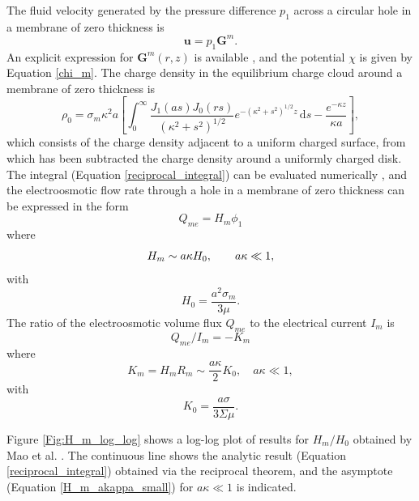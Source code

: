 The fluid velocity generated by the pressure difference $p_1$ across a circular hole in a membrane of zero thickness is
\begin{equation}
\mathbf{u}=p_1\mathbf{G}^m.
\label{u_membrane}
\end{equation}
An explicit expression for $\mathbf{G}^m(r,z)$ is available
\cite{Happel&Brenner,mao2014}, and the potential $\chi$ is given by Equation \ref{chi_m}.
The charge density in the equilibrium charge cloud around a
membrane of zero thickness is \cite{mao2014}
\begin{equation}
\rho_0 = \sigma_m\kappa^2 a \left[  \int_0^\infty
\frac{J_1(as)J_0(rs)}{(\kappa^2+s^2)^{1/2}}
e^{-(\kappa^2+s^2)^{1/2} z}\,\text{d}s - \frac{e^{-\kappa z}}{\kappa a} \right],
\label{eq:rho0_finite}
\end{equation}
which consists of the charge density adjacent to a uniform charged surface,
from which has been subtracted the charge density around a
uniformly charged disk. The integral (Equation \ref{reciprocal_integral})
can be evaluated numerically
\cite{mao2014},
and the electroosmotic flow rate
through a hole in a membrane of zero thickness can be expressed in the form
\begin{equation}
Q_{me}=H_m\phi_1
\label{Hm_defn}
\end{equation}
where
\begin{equation}
H_{m}\sim a\kappa H_0,\hskip 20pt a\kappa\ll 1,
\label{H_m_akappa_small}
\end{equation}
with
\begin{equation}
H_0=\frac{a^2\sigma_m}{3\mu}.
\label{H0_defn}
\end{equation}
The ratio of the electroosmotic volume flux $Q_{me}$
to the electrical current $I_m$ is
\begin{equation}
Q_{me}/I_m=-K_m
\end{equation}
where
\begin{equation}
K_m=H_mR_m\sim \frac{a\kappa}{2} K_0,\quad a\kappa\ll 1,
\end{equation}
with
\begin{equation}
K_0=\frac{a\sigma}{3\Sigma\mu}.
\label{K0_defn}
\end{equation}

Figure \ref{Fig:H_m_log_log}
shows a log-log plot of results for $H_m/H_0$ obtained by
Mao et al. \cite{mao2014}. The continuous line shows the analytic result
(Equation \ref{reciprocal_integral})
obtained via the reciprocal theorem, and
the asymptote (Equation \ref{H_m_akappa_small}) for $a\kappa\ll
1$ is indicated. 

